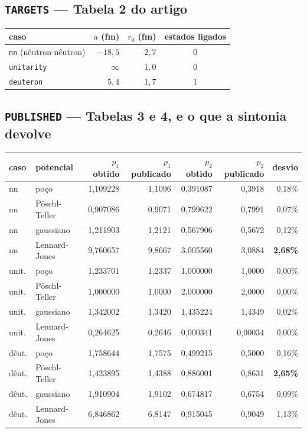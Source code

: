 \documentclass[11pt,a4paper]{article}
\begin{document}
\subsection*{\texttt{TARGETS} --- Tabela 2 do artigo}
\begin{center}
\begin{tabular}{lrrc}
\toprule
caso & $a$ (fm) & $r_0$ (fm) & estados ligados \\
\midrule
\texttt{nn} (nêutron-nêutron) & $-18{,}5$ & $2{,}7$ & 0 \\
\texttt{unitarity} & $\infty$ & $1{,}0$ & 0 \\
\texttt{deuteron} & $5{,}4$ & $1{,}7$ & 1 \\
\bottomrule
\end{tabular}
\end{center}

\subsection*{\texttt{PUBLISHED} --- Tabelas 3 e 4, e o que a sintonia devolve}
\begin{center}
\footnotesize
\begin{tabular}{llrrrrr}
\toprule
caso & potencial & $p_1$ obtido & $p_1$ publicado & $p_2$ obtido & $p_2$ publicado & desvio \\
\midrule
nn & poço          & 1{,}109228 & 1{,}1096 & 0{,}391087 & 0{,}3918 & 0{,}18\% \\
nn & Pöschl-Teller & 0{,}907086 & 0{,}9071 & 0{,}799622 & 0{,}7991 & 0{,}07\% \\
nn & gaussiano     & 1{,}211903 & 1{,}2121 & 0{,}567906 & 0{,}5672 & 0{,}12\% \\
nn & Lennard-Jones & 9{,}760657 & 9{,}8667 & 3{,}005560 & 3{,}0884 & \textbf{2{,}68\%} \\
\addlinespace
unit. & poço          & 1{,}233701 & 1{,}2337 & 1{,}000000 & 1{,}0000 & 0{,}00\% \\
unit. & Pöschl-Teller & 1{,}000000 & 1{,}0000 & 2{,}000000 & 2{,}0000 & 0{,}00\% \\
unit. & gaussiano     & 1{,}342002 & 1{,}3420 & 1{,}435224 & 1{,}4349 & 0{,}02\% \\
unit. & Lennard-Jones & 0{,}264625 & 0{,}2646 & 0{,}000341 & 0{,}00034 & 0{,}00\% \\
\addlinespace
dêut. & poço          & 1{,}758644 & 1{,}7575 & 0{,}499215 & 0{,}5000 & 0{,}16\% \\
dêut. & Pöschl-Teller & 1{,}423895 & 1{,}4388 & 0{,}886001 & 0{,}8631 & \textbf{2{,}65\%} \\
dêut. & gaussiano     & 1{,}910904 & 1{,}9102 & 0{,}674817 & 0{,}6754 & 0{,}09\% \\
dêut. & Lennard-Jones & 6{,}846862 & 6{,}8147 & 0{,}915045 & 0{,}9049 & 1{,}13\% \\
\bottomrule
\end{tabular}
\end{center}
\end{document}
